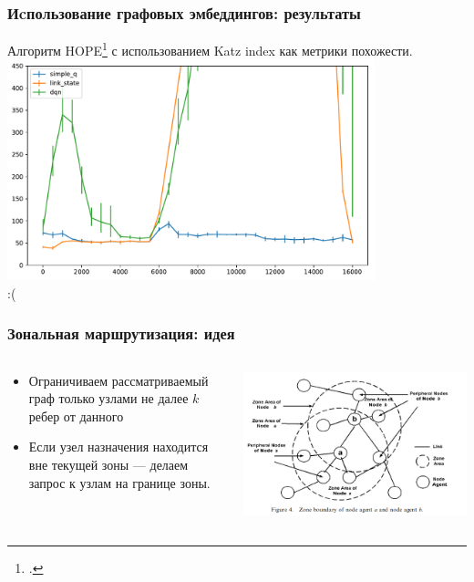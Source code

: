 \documentclass{beamer}
\begin{document}
\begin{frame}
  \frametitle{Иcпользование графовых эмбеддингов: результаты}
  Алгоритм HOPE\footcite{ou2016asymmetric} с использованием Katz index как
  метрики похожести.
  \includegraphics[width=0.8\textwidth]{peak-load-embedding} \\
  :(
\end{frame}


\begin{frame}
  \frametitle{Зональная маршрутизация: идея}
  \begin{columns}
    \begin{column}{0.6\textwidth}
      \begin{itemize}
      \item Ограничиваем рассматриваемый граф только узлами не далее $k$ ребер от
        данного 
      \item Если узел назначения находится вне текущей зоны --- делаем запрос к
        узлам на границе зоны.
      \end{itemize}
    \end{column}
    \begin{column}{0.4\textwidth}
      \begin{center}
        \includegraphics[width=\textwidth]{zone-routing}
      \end{center}
    \end{column}
  \end{columns}
\end{frame}
\end{document}
